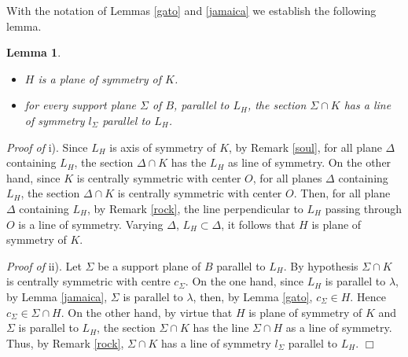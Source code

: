 \documentclass[12pt]{amsart}
\newtheorem{lemma}{Lemma}
\newcommand{\fin}{\hfill $\Box$}
\begin{document}
With the notation of Lemmas \ref{gato} and \ref{jamaica} we establish the following lemma.
\begin{lemma}\label{limon} \
 \begin{itemize} 
                  \item [i)] $H$ is a plane of symmetry of $K$. 
                  \item [ii)] for every support plane $\Sigma$ of $B$, parallel to $L_H$, the section 
                  $\Sigma \cap K$ has a line of symmetry $l_{\Sigma}$ 
                  parallel to $L_H$.
\end{itemize}
 \end{lemma}
                   \textit{Proof of} i).
                  Since $L_H$ is axis of symmetry of $K$, by Remark \ref{soul}, for all plane $\Delta$ 
                  containing $L_H$, the section $\Delta \cap K$ has the $L_H$ as  line of 
                  symmetry. On the other hand, since $K$ is centrally symmetric with center $O$, 
                  for all planes $\Delta$ containing $L_H$, the section $\Delta \cap K$ is 
                  centrally symmetric with center $O$. Then, for 
                  all plane $\Delta$ containing $L_H$, by Remark \ref{rock}, the line 
                  perpendicular to $L_H$ passing through $O$ is a line of symmetry. Varying 
                  $\Delta$, $L_H\subset \Delta$, it follows that $H$ is plane of symmetry of 
                  $K$.
                 
   \textit{Proof of} ii).
                Let $\Sigma$ be a support plane of $B$ parallel to $L_H$. By hypothesis 
                 $\Sigma \cap K$ is centrally symmetric with centre $c_{\Sigma}$. On the one hand, 
                 since $L_H$ is parallel to $\lambda$, by Lemma \ref{jamaica}, $\Sigma$ is 
                 parallel to $\lambda$, then, by Lemma \ref{gato}, $c_{\Sigma}\in H$. Hence 
                 $c_{\Sigma}\in \Sigma \cap H$. On the other hand, by virtue that $H$ is plane of 
                 symmetry of $K$ and $\Sigma$ is parallel to $L_H$, the section $\Sigma \cap K$
                  has the line $\Sigma \cap H$ as a line of symmetry. Thus, by Remark \ref{rock}, 
                  $\Sigma \cap K$ has a line of symmetry $l_{\Sigma}$ parallel to $L_H$.
                 \fin
                 
\end{document}
